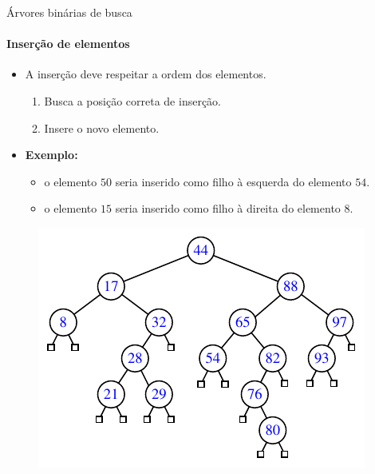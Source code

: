 \begin{frame}{Árvores binárias de busca}
\framesubtitle{Inserção de elementos}
\begin{itemize}
	\item A inserção deve respeitar a ordem dos elementos.
	\begin{enumerate}
		\item Busca a posição correta de inserção.
		\item Insere o novo elemento.
	\end{enumerate}
	\item \textbf{Exemplo:}
	\begin{itemize}
		\item o elemento $50$ seria inserido como filho à esquerda do elemento $54$.
		\item o elemento $15$ seria inserido como filho à direita do elemento $8$.
	\end{itemize}
\end{itemize}

\begin{figure}
	\centering
	\includegraphics[width=0.55\linewidth]{img/figure-11-1}
\end{figure}
\end{frame}



